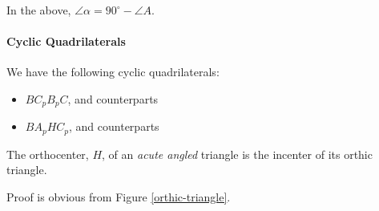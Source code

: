 \documentclass[11pt,twoside]{scrartcl}
\begin{document}
In the above, $\angle \alpha = 90^\circ - \angle A$.

\paragraph{Cyclic Quadrilaterals} We have the following cyclic quadrilaterals:
\begin{itemize}
    \item $BC_pB_pC$, and counterparts
    \item $BA_pHC_p$, and counterparts
\end{itemize}

\begin{theorem}
    The orthocenter, $H$, of an \emph{acute angled} triangle is the incenter of its orthic triangle.
\end{theorem}
Proof is obvious from Figure \ref{orthic-triangle}.
\end{document}
